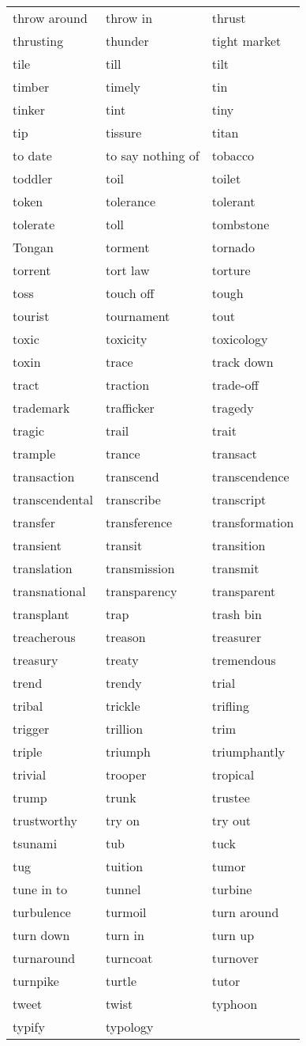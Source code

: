 \documentclass{minimal}
\begin{document}
\begin{longtable}{p{2.7cm}@{\hskip 0.2cm}p{2.7cm}@{\hskip 0.2cm}p{2.7cm}}
throw around & throw in & thrust \\
thrusting & thunder & tight market \\
tile & till & tilt \\
timber & timely & tin \\
tinker & tint & tiny \\
tip & tissure & titan \\
to date & to say nothing of & tobacco \\
toddler & toil & toilet \\
token & tolerance & tolerant \\
tolerate & toll & tombstone \\
Tongan & torment & tornado \\
torrent & tort law & torture \\
toss & touch off & tough \\
tourist & tournament & tout \\
toxic & toxicity & toxicology \\
toxin & trace & track down \\
tract & traction & trade-off \\
trademark & trafficker & tragedy \\
tragic & trail & trait \\
trample & trance & transact \\
transaction & transcend & transcendence \\
transcendental & transcribe & transcript \\
transfer & transference & transformation \\
transient & transit & transition \\
translation & transmission & transmit \\
transnational & transparency & transparent \\
transplant & trap & trash bin \\
treacherous & treason & treasurer \\
treasury & treaty & tremendous \\
trend & trendy & trial \\
tribal & trickle & trifling \\
trigger & trillion & trim \\
triple & triumph & triumphantly \\
trivial & trooper & tropical \\
trump & trunk & trustee \\
trustworthy & try on & try out \\
tsunami & tub & tuck \\
tug & tuition & tumor \\
tune in to & tunnel & turbine \\
turbulence & turmoil & turn around \\
turn down & turn in & turn up \\
turnaround & turncoat & turnover \\
turnpike & turtle & tutor \\
tweet & twist & typhoon \\
typify & typology
\end{longtable}
\end{document}
